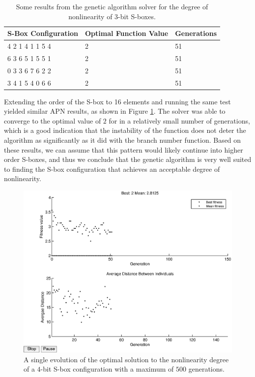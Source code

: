 \documentclass[11pt]{article}
\begin{document}
\begin{table}
	\centering
	\caption{Some results from the genetic algorithm solver for the degree of nonlinearity of $3$-bit S-boxes.}
	\label{nlTable}
    \begin{tabular}{|l|l|l|}
        \hline
        S-Box Configuration & Optimal Function Value & Generations \\ \hline
        4     2     1     4     1     1     5     4 & 2 & 51 \\ 
        6     3     6     5     1     5     5     1 & 2 & 51 \\ 
        0     3     3     6     7     6     2     2 & 2 & 51 \\ 
        3     4     1     5     4     0     6     6 & 2 & 51 \\ 
        \hline
    \end{tabular}
\end{table}

Extending the order of the S-box to 16 elements and running the same test yielded similar APN results, as shown in Figure \ref{nl16}. The solver was able to converge to the optimal value of $2$ for in a relatively small number of generations, which is a good indication that the instability of the function does not deter the algorithm as significantly as it did with the branch number function. Based on these results, we can assume that this pattern would likely continue into higher order S-boxes, and thus we conclude that the genetic algorithm is very well suited to finding the S-box configuration that achieves an acceptable degree of nonlinearity.

\begin{figure}[!ht]
	\centering
	\includegraphics[scale=0.5]{images/nl_results16.eps} 

\caption{A single evolution of the optimal solution to the nonlinearity degree of a $4$-bit S-box configuration with a maximum of $500$ generations.}
	\label{nl16}
\end{figure}
\end{document}
